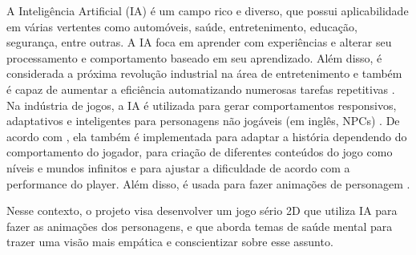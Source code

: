 A Inteligência Artificial (IA) é um campo rico e diverso, que possui aplicabilidade em várias vertentes como automóveis, saúde, entretenimento, educação, segurança, entre outras. A IA foca em aprender com experiências e alterar seu processamento e comportamento baseado em seu aprendizado. Além disso, é considerada a próxima revolução industrial na área de entretenimento e também é capaz de aumentar a eficiência automatizando numerosas tarefas repetitivas \cite{articleIAEntretenimento}. Na indústria de jogos, a IA é utilizada para  gerar comportamentos responsivos, adaptativos e inteligentes para personagens não jogáveis (em inglês, NPCs) \cite{IA_jogos}. De acordo com , ela também é implementada para adaptar a história dependendo do comportamento do jogador, para criação de diferentes conteúdos do jogo como níveis e mundos infinitos e para ajustar a dificuldade de acordo com a performance do player. Além disso, é usada para fazer animações de personagem \cite{xian2023automated}.

Nesse contexto, o projeto visa desenvolver um jogo sério 2D que utiliza IA para fazer as animações dos personagens, e que aborda temas de saúde mental para trazer uma visão mais empática e conscientizar sobre esse assunto. 







 
 
  